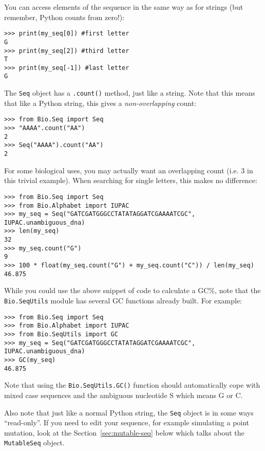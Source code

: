You can access elements of the sequence in the same way as for strings (but remember, Python counts from zero!):

\begin{verbatim}
>>> print(my_seq[0]) #first letter
G
>>> print(my_seq[2]) #third letter
T
>>> print(my_seq[-1]) #last letter
G
\end{verbatim}

The \verb|Seq| object has a \verb|.count()| method, just like a string.
Note that this means that like a Python string, this gives a
\emph{non-overlapping} count:

\begin{verbatim}
>>> from Bio.Seq import Seq
>>> "AAAA".count("AA")
2
>>> Seq("AAAA").count("AA")
2
\end{verbatim}

\noindent For some biological uses, you may actually want an overlapping count
(i.e. $3$ in this trivial example). When searching for single letters, this
makes no difference:

\begin{verbatim}
>>> from Bio.Seq import Seq
>>> from Bio.Alphabet import IUPAC
>>> my_seq = Seq("GATCGATGGGCCTATATAGGATCGAAAATCGC", IUPAC.unambiguous_dna)
>>> len(my_seq)
32
>>> my_seq.count("G")
9
>>> 100 * float(my_seq.count("G") + my_seq.count("C")) / len(my_seq)
46.875
\end{verbatim}

While you could use the above snippet of code to calculate a GC\%, note that  the \verb|Bio.SeqUtils| module has several GC functions already built.  For example:

\begin{verbatim}
>>> from Bio.Seq import Seq
>>> from Bio.Alphabet import IUPAC
>>> from Bio.SeqUtils import GC
>>> my_seq = Seq("GATCGATGGGCCTATATAGGATCGAAAATCGC", IUPAC.unambiguous_dna)
>>> GC(my_seq)
46.875
\end{verbatim}

\noindent Note that using the \verb|Bio.SeqUtils.GC()| function should automatically cope with mixed case sequences and the ambiguous nucleotide S which means G or C.

Also note that just like a normal Python string, the \verb|Seq| object is in some ways ``read-only''.  If you need to edit your sequence, for example simulating a point mutation, look at the Section~\ref{sec:mutable-seq} below which talks about the \verb|MutableSeq| object.

